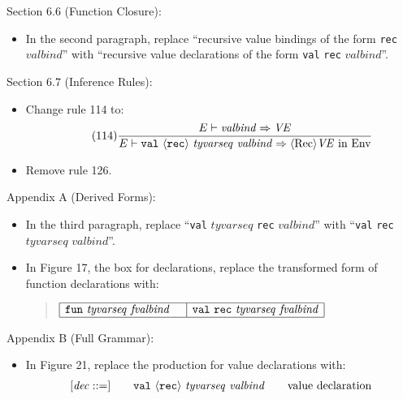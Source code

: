 \documentclass[twoside,titlepage]{article}
\begin{document}
\begin{appendix}
Section 6.6 (Function Closure):
\begin{itemize}
\item In the second paragraph, replace ``recursive value bindings of the form {\tt rec} $\mathit{valbind}$'' with ``recursive value declarations of the form {\tt val} {\tt rec} $\mathit{valbind}$''.
\end{itemize}

Section 6.7 (Inference Rules):
\begin{itemize}
\item Change rule 114 to: 
  \begin{equation}
  \tag{114}
  \frac{
  E \vdash \mathit{valbind} \Rightarrow \mathit{VE}
  }{
  E \vdash {\tt{val}}~\langle{\tt{rec}}\rangle~\mathit{tyvarseq}~\mathit{valbind} \Rightarrow \mbox{$\langle\mbox{Rec}\rangle\mathit{VE}$ in Env}
  }
  \end{equation}

\item Remove rule 126.
\end{itemize}

Appendix A (Derived Forms):
\begin{itemize}
\item In the third paragraph, replace ``{\tt{val}} $\mathit{tyvarseq}$ {\tt rec} $\mathit{valbind}$'' with ``{\tt{val}} {\tt rec} $\mathit{tyvarseq}$ $\mathit{valbind}$''.

\item In Figure 17, the box for declarations, replace the transformed form of function declarations with:
  \begin{quote}
  $\begin{array}{|l|l|}
  \hline
  {\tt{fun}}~\mathit{tyvarseq}~\mathit{fvalbind}~~~
  & {\tt{val}}~{\tt{rec}}~\mathit{tyvarseq}~\mathit{fvalbind} \\
  \hline
  \end{array}$
  \end{quote}
\end{itemize}

Appendix B (Full Grammar):
\begin{itemize}
\item In Figure 21, replace the production for value declarations with:
  $$
  \begin{array}{l@{\qquad}l@{\qquad}l}
  [\mathit{dec} ::=] & {\tt{val}}~\langle{\tt{rec}}\rangle~\mathit{tyvarseq}~\mathit{valbind} & \textrm{value declaration}
  \end{array}
  $$


\end{itemize}
\end{appendix}
\end{document}

